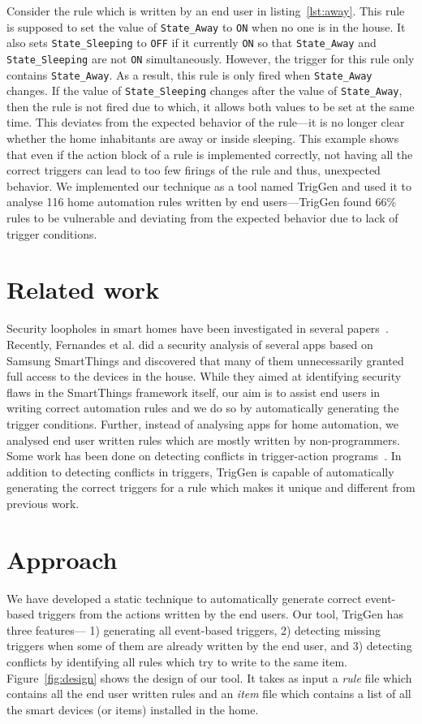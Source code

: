 \documentclass{sig-alternate-05-2015}
\begin{document}
Consider the rule which is written by an end user in listing~\ref{lst:away}. This rule is supposed to set the value of \texttt{State\_Away} to \texttt{ON} when no one is in the house. It also sets \texttt{State\_Sleeping} to \texttt{OFF} if it currently \texttt{ON} so that  \texttt{State\_Away} and \texttt{State\_Sleeping} are not \texttt{ON} simultaneously. However, the trigger for this rule only contains \texttt{State\_Away}. As a result, this rule is only fired when \texttt{State\_Away} changes. If the value of \texttt{State\_Sleeping} changes after the value of \texttt{State\_Away}, then the rule is not fired due to which, it allows both values to be set at the same time. This deviates from the expected behavior of the rule---it is no longer clear whether the home inhabitants are away or inside sleeping. This example shows that even if the action block of a rule is implemented correctly, not having all the correct triggers can lead to too few firings of the rule and thus, unexpected behavior. 
We implemented our technique as a tool named TrigGen and used it to analyse 116 home automation rules written by end users---TrigGen found 66\% rules to be vulnerable and deviating from the expected behavior due to lack of trigger conditions.

\section{Related work}
Security loopholes in smart homes have been investigated in several papers~\cite{yoshi, dhanjani, jung, todayToTomorrow}. Recently, Fernandes et al.\cite{smartthings16} did a  security analysis of several apps based on Samsung SmartThings and discovered that many of them unnecessarily granted full access to the devices in the house. While they aimed at identifying security flaws in the SmartThings framework itself, our aim is to assist end users in writing correct automation rules and we do so by automatically generating the trigger conditions.  Further, instead of analysing apps for home automation, we analysed end user written rules which are mostly written by non-programmers. Some work has been done on detecting conflicts in trigger-action programs~\cite{rvs, homer, utea}. In addition to detecting conflicts in triggers, TrigGen is capable of automatically generating the correct triggers for a rule which makes it unique and different from previous work.

\section{Approach}
We have developed a static technique to automatically generate correct event-based triggers from the actions written by the end users. Our tool, TrigGen has three features--- 1) generating all event-based triggers, 2) detecting missing triggers when some of them are already written by the end user, and 3) detecting conflicts by identifying all rules which try to write to the same item. 
Figure~\ref{fig:design} shows the design of our tool. It takes as input a \textit{rule} file which contains all the end user written rules and an \textit{item} file which contains a list of all the smart devices (or items) installed in the home. 
\end{document}
